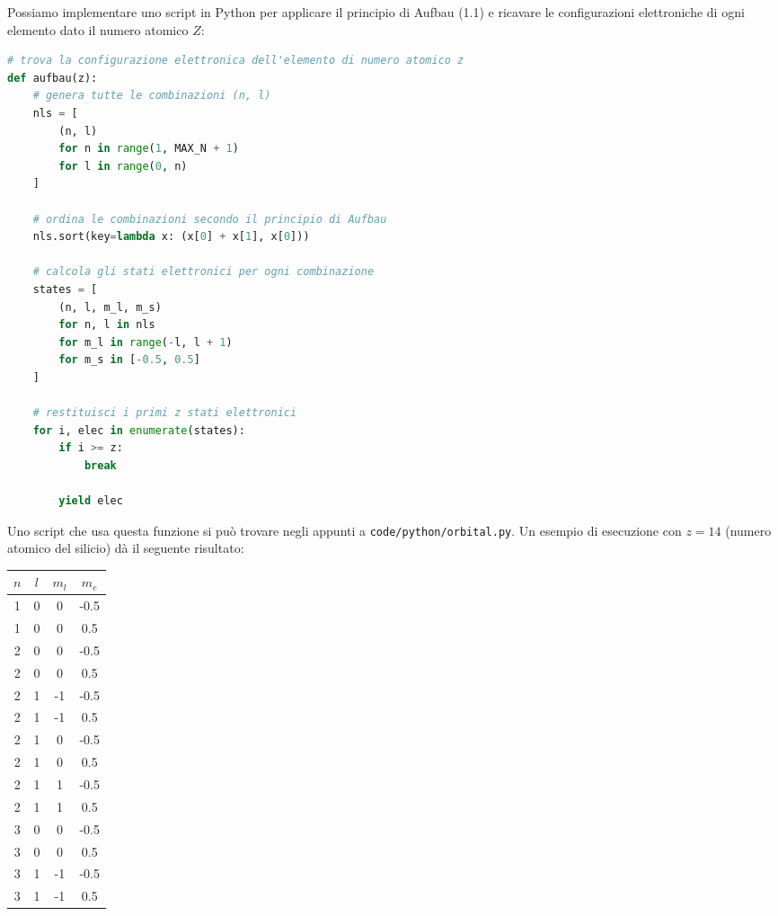 \documentclass[a4paper,11pt]{article}
\begin{document}
Possiamo implementare uno script in Python per applicare il principio di Aufbau (1.1) e ricavare le configurazioni elettroniche di ogni elemento dato il numero atomico $Z$:
\begin{lstlisting}[language=python, style=codestyle]
# trova la configurazione elettronica dell'elemento di numero atomico z
def aufbau(z):
    # genera tutte le combinazioni (n, l)
    nls = [
        (n, l)
        for n in range(1, MAX_N + 1)
        for l in range(0, n)
    ]
    
    # ordina le combinazioni secondo il principio di Aufbau
    nls.sort(key=lambda x: (x[0] + x[1], x[0]))

    # calcola gli stati elettronici per ogni combinazione 
    states = [
        (n, l, m_l, m_s)
        for n, l in nls
        for m_l in range(-l, l + 1)
        for m_s in [-0.5, 0.5]
    ]

    # restituisci i primi z stati elettronici 
    for i, elec in enumerate(states):
        if i >= z:
            break

        yield elec
\end{lstlisting}

Uno script che usa questa funzione si può trovare negli appunti a \texttt{code/python/orbital.py}. Un esempio di esecuzione con $z = 14$ (numero atomico del silicio) dà il seguente risultato:
\begin{table}[h!]
\centering
\begin{tabular}{c|c|c|c}
$n$ & $l$ & $m_l$ & $m_e$ \\ 
\hline
1 & 0 & 0  & -0.5 \\ 
1 & 0 & 0  & 0.5 \\ 
2 & 0 & 0  & -0.5 \\ 
2 & 0 & 0  & 0.5 \\ 
2 & 1 & -1 & -0.5 \\ 
2 & 1 & -1 & 0.5 \\ 
2 & 1 & 0  & -0.5 \\ 
2 & 1 & 0  & 0.5 \\ 
2 & 1 & 1  & -0.5 \\ 
2 & 1 & 1  & 0.5 \\ 
3 & 0 & 0  & -0.5 \\ 
3 & 0 & 0  & 0.5 \\ 
3 & 1 & -1 & -0.5 \\ 
3 & 1 & -1 & 0.5 \\ 
\end{tabular}
\end{table}
\end{document}
